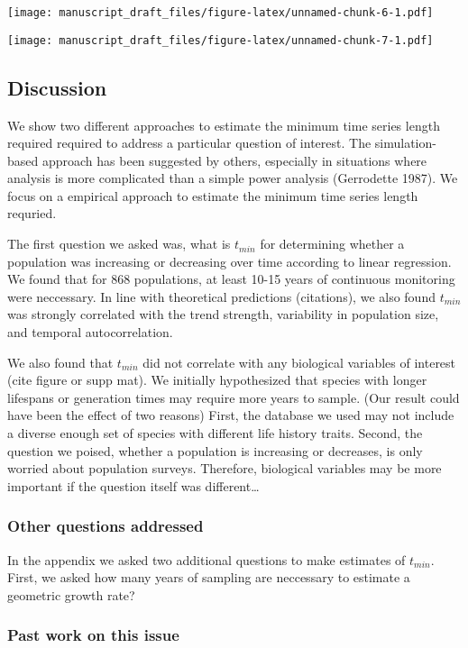 \documentclass[11pt,]{article}
\begin{document}
\texttt{[image: manuscript\_draft\_files/figure-latex/unnamed-chunk-6-1.pdf]}

\texttt{[image: manuscript\_draft\_files/figure-latex/unnamed-chunk-7-1.pdf]}

\subsection{Discussion}\label{discussion}

We show two different approaches to estimate the minimum time series
length required required to address a particular question of interest.
The simulation-based approach has been suggested by others, especially
in situations where analysis is more complicated than a simple power
analysis (Gerrodette 1987). We focus on a empirical approach to estimate
the minimum time series length requried.

The first question we asked was, what is \(t_{min}\) for determining
whether a population was increasing or decreasing over time according to
linear regression. We found that for 868 populations, at least 10-15
years of continuous monitoring were neccessary. In line with theoretical
predictions (citations), we also found \(t_{min}\) was strongly
correlated with the trend strength, variability in population size, and
temporal autocorrelation.

We also found that \(t_{min}\) did not correlate with any biological
variables of interest (cite figure or supp mat). We initially
hypothesized that species with longer lifespans or generation times may
require more years to sample. (Our result could have been the effect of
two reasons) First, the database we used may not include a diverse
enough set of species with different life history traits. Second, the
question we poised, whether a population is increasing or decreases, is
only worried about population surveys. Therefore, biological variables
may be more important if the question itself was different\ldots{}

\subsubsection{Other questions
addressed}\label{other-questions-addressed}

In the appendix we asked two additional questions to make estimates of
\(t_{min}\). First, we asked how many years of sampling are neccessary
to estimate a geometric growth rate?

\subsubsection{Past work on this issue}\label{past-work-on-this-issue}
\end{document}
